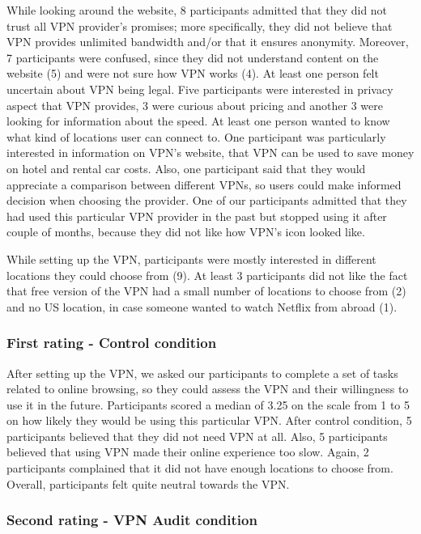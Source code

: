While looking around the website, 8 participants admitted that they did not trust all VPN provider's promises; more specifically, they did not believe that VPN provides unlimited bandwidth and/or that it ensures anonymity. Moreover, 7 participants were confused, since they did not understand content on the website (5) and were not sure how VPN works (4). At least one person felt uncertain about VPN being legal. Five participants were interested in privacy aspect that VPN provides, 3 were curious about pricing and another 3 were looking for information about the speed. At least one person wanted to know what kind of locations user can connect to. One participant was particularly interested in information on VPN's website, that VPN can be used to save money on hotel and rental car costs. 
Also, one participant said that they would appreciate a comparison between different VPNs, so users could make informed decision when choosing the provider. One of our participants admitted that they had used this particular VPN provider in the past but stopped using it after couple of months, because they did not like how VPN's icon looked like. 

While setting up the VPN, participants were mostly interested in different locations they could choose from (9). At least 3 participants did not like the fact that free version of the VPN had a small number of locations to choose from (2) and no US location, in case someone wanted to watch Netflix from abroad (1).


\subsubsection{First rating - Control condition}

After setting up the VPN, we asked our participants to complete a set of tasks related to online browsing, so they could assess the VPN and their willingness to use it in the future. Participants scored a median of 3.25 on the scale from 1 to 5 on how likely they would be using this particular VPN. After control condition, 5 participants believed that they did not need VPN at all. Also, 5 participants believed that using VPN made their online experience too slow. Again, 2 participants complained that it did not have enough locations to choose from. Overall, participants felt quite neutral towards the VPN.


\subsubsection{Second rating - VPN Audit condition}

